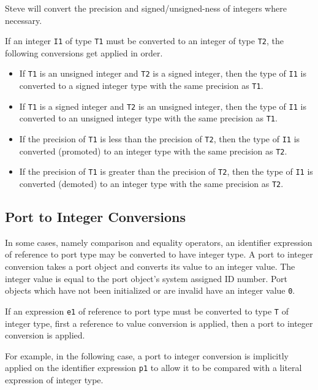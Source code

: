 Steve will convert the precision and signed/unsigned-ness of integers where necessary.

If an integer \texttt{I1} of type \texttt{T1} must be converted to an integer of type \texttt{T2}, the following conversions get applied in order.

\begin{itemize}
\item If \texttt{T1} is an unsigned integer and \texttt{T2} is a signed integer, then the type of \texttt{I1} is converted to a signed integer type with the same precision as \texttt{T1}.

\item If \texttt{T1} is a signed integer and \texttt{T2} is an unsigned integer, then the type of \texttt{I1} is converted to an unsigned integer type with the same precision as \texttt{T1}.

\item If the precision of \texttt{T1} is less than the precision of \texttt{T2}, then the type of \texttt{I1} is converted (promoted) to an integer type with the same precision as \texttt{T2}.

\item If the precision of \texttt{T1} is greater than the precision of \texttt{T2}, then the type of \texttt{I1} is converted (demoted) to an integer type with the same precision as \texttt{T2}.
\end{itemize}

\subsection{Port to Integer Conversions} \label{port_conv}

In some cases, namely comparison and equality operators, an identifier expression of reference to port type may be converted to have integer type. A port to integer conversion takes a port object and converts its value to an integer value. The integer value is equal to the port object's system assigned ID number. Port objects which have not been initialized or are invalid have an integer value \texttt{0}.

If an expression \texttt{e1} of reference to port type must be converted to type \texttt{T} of integer type, first a reference to value conversion is applied, then a port to integer conversion is applied.

For example, in the following case, a port to integer conversion is implicitly applied on the identifier expression \texttt{p1} to allow it to be compared with a literal expression of integer type.

